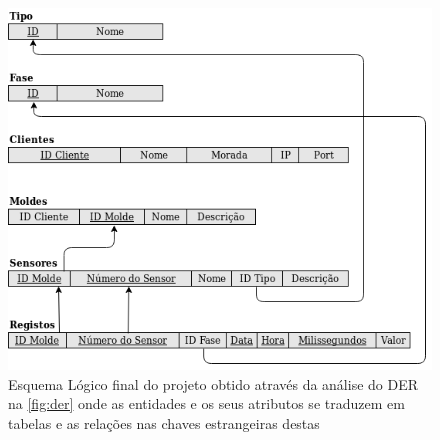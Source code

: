 \documentclass[11pt,twoside,a4paper]{report}
\begin{document}
\begin{figure}[H]
	\begin{center}
		\includegraphics[width=1\textwidth]{esquema_relacional} %
		\caption[Esquema Lógico final do projeto]{Esquema Lógico final do projeto obtido através da análise do DER na \autoref{fig:der} onde as entidades e os seus atributos se traduzem em tabelas e as relações nas chaves estrangeiras destas}
		\label{fig:er}
	\end{center}
\end{figure}

\newpage
\end{document}

